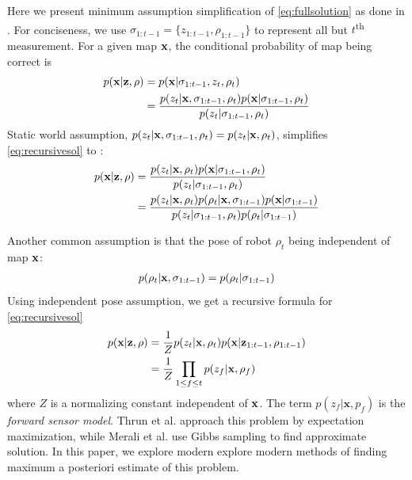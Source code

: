 \documentclass[letterpaper, 10 pt, conference]{ieeeconf} %
\newcommand{\vect}[1]{\mathbf{#1}}
\begin{document}
   Here we present minimum assumption simplification of
   \eqref{eq:fullsolution} as done in \cite{thrun2003learning,merali2013icra}. 
   For conciseness, we use 
   $\sigma_{1:t-1} = \{z_{1:t-1}, \rho_{1:t-1}\}$ to represent all but
   $t$\textsuperscript{th} measurement. For a given map $\map$, the conditional
   probability of map being correct is
   \begin{align}
     p(\map | \measurements, \rho) &= p(\map | \sigma_{1:t-1}, z_t, \rho_t)\\
                    &= \frac{p(z_t|\map , \sigma_{1:t-1}, \rho_t)p(\map| \sigma_{1:t-1}, \rho_t)}
                            {p(z_t|\sigma_{1:t-1}, \rho_t)}
     \label{eq:recursivesol}
   \end{align}
   Static world assumption, $p(z_t|\map, \sigma_{1:t-1}, \rho_t) = p(z_t|\map, \rho_t)$, simplifies \eqref{eq:recursivesol} to :
   \begin{align}
     p(\map|\measurements, \rho) &= \frac{p(z_t|\map, \rho_t)p(\map| \sigma_{1:t-1}, \rho_t)}
                          {p(z_t|\sigma_{1:t-1}, \rho_t)}\\
                  &= \frac{p(z_t|\map, \rho_t)p(\rho_t|\map, \sigma_{1:t-1})p(\map| \sigma_{1:t-1})}
                          {p(z_t|\sigma_{1:t-1}, \rho_t)p(\rho_t|\sigma_{1:t-1})}
   \end{align}

   Another common assumption is that the pose of robot $\rho_t$ being independent of map $\map$:
   \begin{align}
     p(\rho_t|\map, \sigma_{1:t-1}) = p(\rho_t|\sigma_{1:t-1})
   \end{align}
   Using independent pose assumption, we get a recursive formula for \eqref{eq:recursivesol}
   \begin{align}
     p(\map | \measurements, \rho) &= \frac{1}{Z} p(z_t|\map , \rho_t)p(\map| \measurements_{1:t-1}, \rho_{1:t-1})\\
                       &= \frac{1}{Z} \prod_{1 \le f \le t} p(z_f|\map, \rho_f)
     \label{eq:map}
   \end{align}
   where $Z$ is a normalizing constant independent of $\map$. The term $p(z_f|\vect{x}, p_f)$ is the \emph{forward sensor model}. Thrun et al. \cite{thrun2003learning} approach this problem by expectation maximization, while Merali et al. \cite{merali2013icra} use Gibbs sampling to find approximate solution. In this paper, we explore modern explore modern methods of finding maximum a posteriori estimate of this problem.
\end{document}
